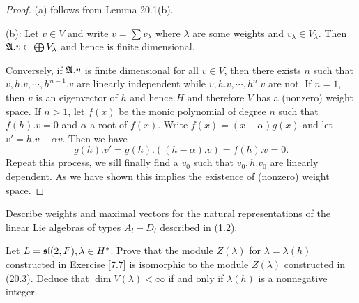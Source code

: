 \begin{proof}
	(a) follows from Lemma 20.1(b).
	
	(b): Let $v\in V$ and write $v=\sum v_{\lambda}$ where $\lambda$ are some weights and $v_{\lambda}\in V_{\lambda}$. Then $\AAa.v \subset \bigoplus V_{\lambda}$ and hence is finite dimensional. 
	
	Conversely, if $\AAa.v$ is finite dimensional for all $v\in V$, then there exists $n$ such that $v,h.v,\cdots,h^{n-1}.v$ are linearly independent while $v, h.v, \cdots, h^{n}.v$ are not. If $n=1$, then $v$ is an eigenvector of $h$ and hence $H$ and therefore $V$ has a (nonzero) weight space. If $n>1$, let $f(x)$ be the monic polynomial of degree $n$ such that $f(h).v=0$ and $\alpha$ a root of $f(x)$. Write $f(x)=(x-\alpha)g(x)$ and let $v'=h.v-\alpha v$. Then we have
	\[
	g(h).v' = g(h).((h-\alpha).v) = f(h).v = 0.
	\]
	Repeat this process, we sill finally find a $v_0$ such that $v_0, h.v_0$ are linearly dependent. As we have shown this implies the existence of (nonzero) weight space.
\end{proof}
\begin{ex}
	Describe weights and maximal vectors for the natural representations of the linear Lie algebras of types $A_l - D_l$ described in (1.2).
\end{ex}
\begin{ex}
	Let $L = \sl(2, F), \lambda\in H^{\ast}$. Prove that the module $Z(\lambda)$ for $\lambda=\lambda(h)$ constructed in Exercise \ref{7.7} is isomorphic to the module $Z(\lambda)$ constructed in (20.3). Deduce that $\dim V(\lambda) < \infty$ if and only if $\lambda(h)$ is a nonnegative integer.
\end{ex}
